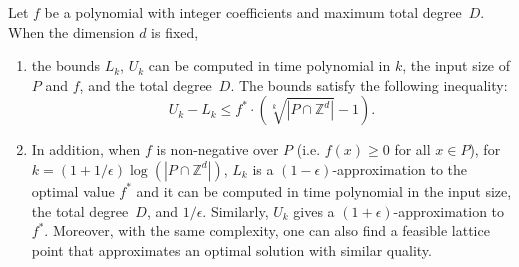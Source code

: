 \documentclass[twoside]{article}
\newcommand{\Z}{\mathbb Z}
\newcommand{\1}{{\bf 1}}
\begin{document}
\begin{lemma}\label{lemma:bounds}
  Let $f$ be a polynomial with integer coefficients and maximum total
  degree~$D$. When the dimension $d$ is fixed,

\begin{enumerate}  
\item the bounds $L_k$, $U_k$ can be computed in time polynomial in
  $k$, the input size of $P$ and $f$, and the total degree~$D$. The bounds
  satisfy the following inequality:
$$ 
U_k-L_k \leq f^* \cdot \left(\sqrt[k]{|P \cap \Z^d|}-1 \right).
$$
\item In addition, when $f$ is non-negative over $P$ (i.e. $f(x)\geq 0$
  for all $x \in P$), for $k=(1+1/\epsilon)\log({|P \cap \Z^d|})$,
  $L_k$ is a $(1-\epsilon)$-approximation to the optimal value $f^*$ and it
  can be computed in time polynomial in the input size, the total
  degree~$D$, and $1/\epsilon$. Similarly, $U_k$ gives a
  $(1+\epsilon)$-approximation to $f^*$. Moreover, with the same
  complexity, one can also find a feasible lattice point that
  approximates an optimal solution with similar quality.
\end{enumerate}
\end{lemma}
\end{document}
